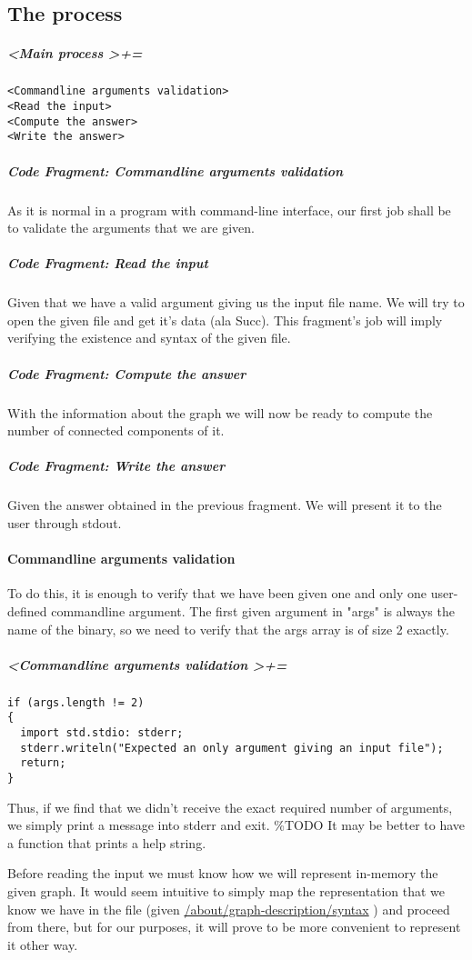\documentclass{book}
\begin{document}
\subsection{The process}
\hypertarget{/program/main/process}{}
\subparagraph{\emph{\textless Main process \textgreater += }}
{
\color{teal}
\begin{verbatim}
<Commandline arguments validation>
<Read the input>
<Compute the answer>
<Write the answer>
\end{verbatim}
}
\subparagraph{\emph{Code Fragment: Commandline arguments validation}}
As it is normal in a program with command-line interface, our 
first job shall be to validate the arguments that we are given. 
\subparagraph{\emph{Code Fragment: Read the input}}
Given that we have a valid argument giving us the input file name. 
We will try to open the given file and get it's data (ala Succ). 
This fragment's job will imply verifying the existence and syntax of 
the given file. 
\subparagraph{\emph{Code Fragment: Compute the answer}}
With the information about the graph we will now be ready to compute the 
number of connected components of it. 
\subparagraph{\emph{Code Fragment: Write the answer}}
Given the answer obtained in the previous fragment. We will present it to 
the user through stdout. 
\paragraph{Commandline arguments validation} 
To do this, it is enough to verify that we have been given one and only one user-defined commandline argument. 
The first given argument in "args" is always the name of the binary, so we need to verify that the args array 
is of size 2 exactly. 
\subparagraph{\emph{\textless Commandline arguments validation \textgreater += }}
{
\color{teal}
\begin{verbatim}
if (args.length != 2)
{
  import std.stdio: stderr;
  stderr.writeln("Expected an only argument giving an input file");
  return;
}
\end{verbatim}
}
Thus, if we find that we didn't receive the exact required number of arguments, we simply print a message into stderr and exit. 
\%TODO It may be better to have a function that prints a help string. 

Before reading the input we must know how we will represent in-memory the given graph. It would seem intuitive to simply map 
the representation that we know we have in the file (given \hypertarget{link3}{\hyperlink{/about/graph-description/syntax}{/about/graph-description/syntax}} ) and proceed from there, but for our purposes, it will 
prove to be more convenient to represent it other way. 
\end{document}
